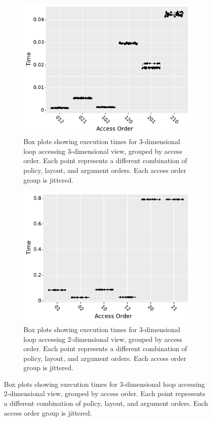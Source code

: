 \documentclass[sigconf,review=true]{acmart}
\begin{document}
\begin{figure}
  \centering
  \begin{subfigure}{0.48\textwidth}
	\includegraphics[width=\textwidth]{benchmark1_boxplot.pdf}
	\caption{Box plots showing execution times for 3-dimensional loop accessing 3-dimensional view, grouped by access order. Each point represents a different combination of policy, layout, and argument orders. Each access order group is jittered.}
	\label{AccessBenchmark1}
  \end{subfigure}
  \hfill
\begin{subfigure}{0.48\textwidth}
	\includegraphics[width=\textwidth]{benchmark2_boxplot.pdf}
	\caption{Box plots showing execution times for 3-dimensional loop accessing 2-dimensional view, grouped by access order. Each point represents a different combination of policy, layout, and argument orders. Each access order group is jittered.}
	\label{AccessBenchmark2}
\end{subfigure}


\end{figure}
\end{document}
